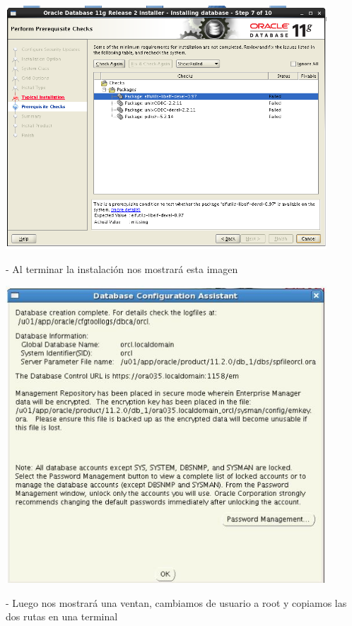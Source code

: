 \documentclass[12pt,letterpaper]{article}
\begin{document}
\begin{center}
	\includegraphics[width=12cm]{./Imagenes/49} 
\end{center}

\begin{itemize}
- Al terminar la instalación nos mostrará esta imagen \\
\end{itemize}

\begin{center}
	\includegraphics[width=12cm]{./Imagenes/50} 
\end{center}


\begin{itemize}
- Luego nos mostrará una ventan, cambiamos de usuario a root y copiamos las dos rutas en una terminal \\
\end{itemize}
\end{document}
